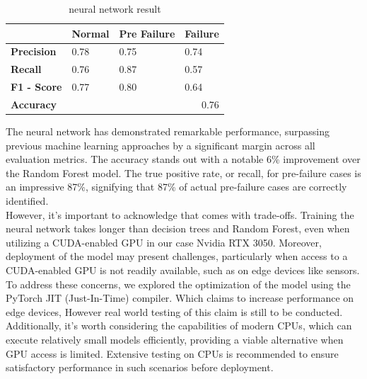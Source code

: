 \documentclass{article}
\begin{document}
\begin{table}[hbpt]
\caption{neural network result}
\centering
\begin{tabular}{|l|lll|}
\hline
                    & \multicolumn{1}{l|}{\textbf{Normal}} & \multicolumn{1}{l|}{\textbf{Pre Failure}} & \textbf{Failure} \\ \hline
\textbf{Precision}  & \multicolumn{1}{l|}{0.78}            & \multicolumn{1}{l|}{0.75}                 & 0.74             \\ \hline
\textbf{Recall}     & \multicolumn{1}{l|}{0.76}            & \multicolumn{1}{l|}{0.87}                 & 0.57             \\ \hline
\textbf{F1 - Score} & \multicolumn{1}{l|}{0.77}            & \multicolumn{1}{l|}{0.80}                 & 0.64             \\ \hline
\textbf{Accuracy}   & \multicolumn{3}{r|}{0.76}                                                                           \\ \hline
\end{tabular}
\end{table}

The neural network has demonstrated remarkable performance, surpassing previous machine learning approaches by a significant margin across all evaluation metrics. The accuracy stands out with a notable 6\% improvement over the Random Forest model. The true positive rate, or recall, for pre-failure cases is an impressive 87\%, signifying that 87\% of actual pre-failure cases are correctly identified.\\

However, it's important to acknowledge that comes with trade-offs. Training the neural network takes longer than decision trees and Random Forest, even when utilizing a CUDA-enabled GPU in our case Nvidia RTX 3050. Moreover, deployment of the model may present challenges, particularly when access to a CUDA-enabled GPU is not readily available, such as on edge devices like sensors.\\

To address these concerns, we explored the optimization of the model using the PyTorch JIT (Just-In-Time) compiler. Which claims to increase performance on edge devices, However real world testing of this claim is still to be conducted. Additionally, it's worth considering the capabilities of modern CPUs, which can execute relatively small models efficiently, providing a viable alternative when GPU access is limited. Extensive testing on CPUs is recommended to ensure satisfactory performance in such scenarios before deployment.
\end{document}
